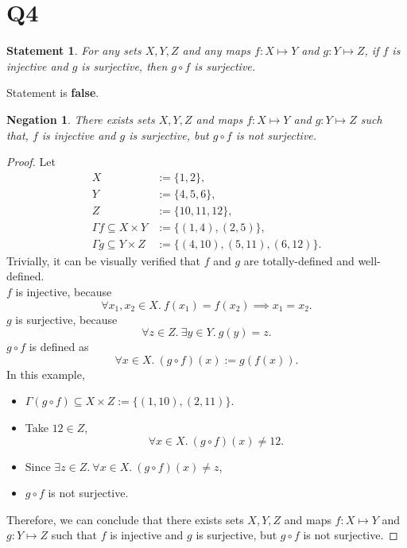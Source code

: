 \documentclass[12pt]{article}
\newtheorem*{stmt}{Statement}
\newtheorem*{negstmt}{Negation}
\begin{document}
\section*{Q4}
\begin{stmt}
    For any sets $X,Y,Z$ and any maps $f:X\mapsto Y$ and $g:Y\mapsto Z$,
    if $f$ is injective and $g$ is surjective, then $g\circ f$ is surjective.
\end{stmt}
Statement is \textbf{false}.
\begin{negstmt}
    There exists sets $X,Y,Z$ and maps $f:X\mapsto Y$ and $g:Y\mapsto Z$ such that,
    $f$ is injective and $g$ is surjective, but $g \circ f$ is not surjective.
\end{negstmt}
\begin{proof}
    Let
    \begin{align*}
        X &:= \{1, 2\},\\
        Y &:=\{4, 5, 6\},\\
        Z &:=\{10, 11, 12\},\\
        \Gamma f \subseteq X\times Y &:=\{(1,4),(2,5)\},\\
        \Gamma g \subseteq Y\times Z &:=\{(4,10), (5,11), (6,12)\}.
    \end{align*}
    Trivially, it can be visually verified that $f$ and $g$ are totally-defined and well-defined.\\
    $f$ is injective, because
        $$\forall x_1,x_2 \in X.~ f(x_1) = f(x_2) \implies x_1 = x_2.$$
    $g$ is surjective, because
        $$\forall z \in Z.~ \exists y \in Y.~ g(y) = z.$$
    $g\circ f$ is defined as $$\forall x \in X.~ (g\circ f)(x) := g(f(x)).$$
    In this example,
    \begin{itemize}[label={}]
        \item $\Gamma (g \circ f) \subseteq X \times Z := \{(1,10),(2,11)\}$.
        \item Take $12 \in Z$,
            $$\forall x \in X.~ (g \circ f)(x) \neq 12.$$
        \item Since $\exists z \in Z.~ \forall x \in X.~ (g \circ f)(x) \neq z$,
        \item $g \circ f$ is not surjective.
    \end{itemize}
    Therefore, we can conclude that there exists sets $X,Y,Z$ and maps $f:X\mapsto Y$ and $g:Y\mapsto Z$ such that $f$ is injective and $g$ is surjective, but $g \circ f$ is not surjective.
\end{proof}
\newpage
\end{document}
